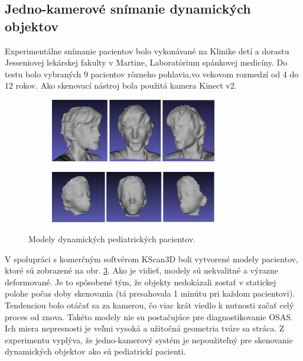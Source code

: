\subsection{Jedno-kamerové snímanie dynamických objektov}

Experimentálne snímanie pacientov bolo vykonávané na Klinike detí a dorastu Jesseniovej lekárskej fakulty v Martine, Laboratórium spánkovej medicíny. Do testu bolo vybraných 9 pacientov rôzneho pohlavia,vo vekovom rozmedzí od 4 do 12 rokov. Ako skenovací nástroj bola použitá kamera Kinect v2.

\begin{figure}[h]
	\centering
	\begin{subfigure}[b]{\textwidth}
		\centering
		\includegraphics[width=0.8\textwidth]{figures/dynamic_patient_a.png}
		\label{fig:dynamic_patient:a}
	\end{subfigure}
	\vskip 8pt 
	\begin{subfigure}[b]{\textwidth}
		\centering
		\includegraphics[width=0.8\textwidth]{figures/dynamic_patient_b.png}
		\label{fig:dynamic_patient:b}
	\end{subfigure}
	\caption{Modely dynamických pediatrických pacientov.}
	\label{fig:dynamic_patient}
\end{figure}

V spolupráci s komerčným softvérom KScan3D boli vytvorené modely pacientov, ktoré sú zobrazené na obr. \ref{fig:dynamic_patient}. Ako je vidieť, modely sú nekvalitné a výrazne deformované. Je to spôsobené tým, že objekty nedokázali zostať v statickej polohe počas doby skenovania (tá presahovala 1 minútu pri každom pacientovi). Tendenciou bolo otáčať sa za kamerou, čo viac krát viedlo k nutnosti začať celý proces od znova. Takéto modely nie su postačujúce pre diagnostikovanie OSAS. Ich miera nepresnosti je veľmi vysoká a užitočná geometria tváre sa stráca. Z experimentu vyplýva, že jedno-kamerový systém je nepoužiteľný pre skenovanie dynamických objektov ako sú pediatrickí pacienti.  


